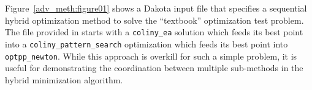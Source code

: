 
Figure~\ref{adv_meth:figure01} shows a Dakota input file that specifies
a sequential hybrid optimization method to solve the
``textbook'' optimization test problem.
The  file
provided in  starts with a
\texttt{coliny\_ea} solution which feeds its best point into a
\texttt{coliny\_pattern\_search} optimization which feeds its best
point into \texttt{optpp\_newton}. While this approach is overkill for
such a simple problem, it is useful for demonstrating the coordination
between multiple sub-methods in the hybrid minimization algorithm.


